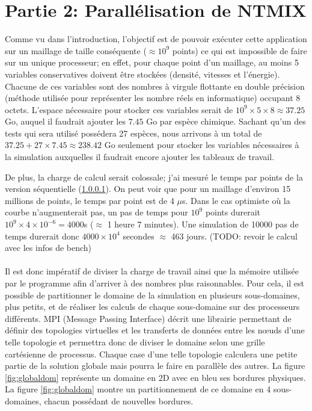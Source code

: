 \section{Partie 2: Parallélisation de NTMIX}


Comme vu dans l'introduction, l'objectif est de pouvoir exécuter cette application sur un maillage de taille conséquente ($\approx 10^9$ points) ce qui est impossible de faire sur un unique processeur; en effet, pour chaque point d'un maillage, au moins 5 variables conservatives doivent être stockées (densité, vitesses et l'énergie). Chacune de ces variables sont des nombres à virgule flottante en double précision (méthode utilisée pour représenter les nombre réels en informatique) occupant 8 octets. L'espace nécessaire pour stocker ces variables serait de $10^9 \times 5 \times 8 \approx 37.25$ Go, auquel il faudrait ajouter les $7.45$ Go par espèce chimique. Sachant qu'un des tests qui sera utilisé possédera 27 espèces, nous arrivons à un total de $37.25+27 \times 7.45\approx 238.42$ Go seulement pour stocker les variables nécessaires à la simulation auxquelles il faudrait encore ajouter les tableaux de travail.





De plus, la charge de calcul serait colossale; j'ai mesuré le temps par points de la version séquentielle (\ref{}). On peut voir que pour un maillage d'environ 15 millions de points, le temps par point est de 4 $\mu$s. Dans le cas optimiste où la courbe n'augmenterait pas, un pas de temps pour $10^9$ points durerait $10^9\times4\times10^{-6}=4000$s ($\approx$ 1 heure 7 minutes). Une simulation de 10000 pas de temps durerait donc $4000\times10^4$ secondes $\approx$ 463 jours. (TODO: revoir le calcul avec les infos de bench)


\paragraph{}Il est donc impératif de diviser la charge de travail ainsi que la mémoire utilisée par le programme afin d'arriver à des nombres plus raisonnables. 
Pour cela, il est possible de partitionner le domaine de la simulation en plusieurs sous-domaines, plus petits, et de réaliser les calculs de chaque sous-domaine sur des processeurs différents. MPI (Message Passing Interface) décrit une librairie permettant de définir des topologies virtuelles et les transferts de données entre les nœuds d'une telle topologie et permettra donc de diviser le domaine selon une grille cartésienne de processus. Chaque case d'une telle topologie calculera une petite partie de la solution globale mais pourra le faire en parallèle des autres. La figure \ref{fig:globaldom} représente un domaine en 2D avec en bleu ses bordures physiques. La figure \ref{fig:globaldom} montre un partitionnement de ce domaine en 4 sous-domaines, chacun possédant de nouvelles bordures.

